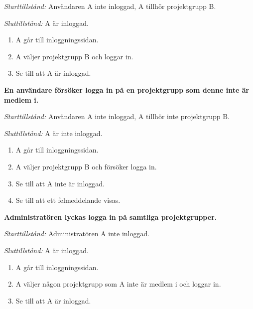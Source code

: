 \documentclass[a4paper]{article}
\begin{document}
\begin{FT}
\emph{Starttillstånd:} Användaren A inte inloggad, A tillhör projektgrupp B.

\emph{Sluttillstånd:} A är inloggad.

\begin{enumerate}
\item A går till inloggningssidan.
\item A väljer projektgrupp B och loggar in.
\item Se till att A är inloggad.
\end{enumerate}

\item
\textbf{En användare försöker logga in på en projektgrupp som denne inte är medlem i.}

\emph{Starttillstånd:} Användaren A inte inloggad, A tillhör inte projektgrupp B.

\emph{Sluttillstånd:} A är inte inloggad.

\begin{enumerate}
\item A går till inloggningssidan.
\item A väljer projektgrupp B och försöker logga in.
\item Se till att A inte är inloggad.
\item Se till att ett felmeddelande visas.
\end{enumerate}

\item
\textbf{Administratören lyckas logga in på samtliga projektgrupper.}

\emph{Starttillstånd:} Administratören A inte inloggad.

\emph{Sluttillstånd:} A är inloggad.

\begin{enumerate}
\item A går till inloggningssidan.
\item A väljer någon projektgrupp som A inte är medlem i och loggar in.
\item Se till att A är inloggad.
\end{enumerate}
\end{FT}




\end{document}
